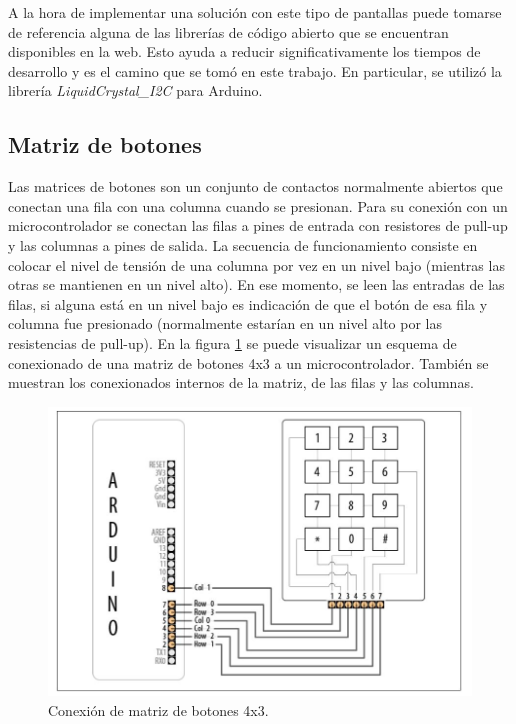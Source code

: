 A la hora de implementar una solución con este tipo de pantallas puede tomarse de referencia alguna de las librerías de código abierto que se encuentran disponibles en la web. Esto ayuda a reducir significativamente los tiempos de desarrollo y es el camino que se tomó en este trabajo. En particular, se utilizó la librería \textit{LiquidCrystal\_I2C} para Arduino\citep{web_repo_display_i2c}.

\subsection{Matriz de botones}
\label{teclado}
Las matrices de botones son un conjunto de contactos normalmente abiertos que conectan una fila con una columna cuando se presionan. Para su conexión con un microcontrolador se conectan las filas a pines de entrada con resistores de pull-up y las columnas a pines de salida. La secuencia de funcionamiento consiste en colocar el nivel de tensión de una columna por vez en un nivel bajo (mientras las otras se mantienen en un nivel alto). En ese momento, se leen las entradas de las filas, si alguna está en un nivel bajo es indicación de que el botón de esa fila y columna fue presionado (normalmente estarían en un nivel alto por las resistencias de pull-up)\citep{Arduino_Cookbook}. En la figura \ref{fig:but_matrix} \citep{Arduino_Cookbook} se puede visualizar un esquema de conexionado de una matriz de botones 4x3 a un microcontrolador. También se muestran los conexionados internos de la matriz, de las filas y las columnas.

\begin{figure}[htbp]
	\centering
	\includegraphics[scale=.6]{./Figures/But_Matrix.JPG}
	\caption{Conexión de matriz de botones 4x3.}
	\label{fig:but_matrix}
\end{figure}

